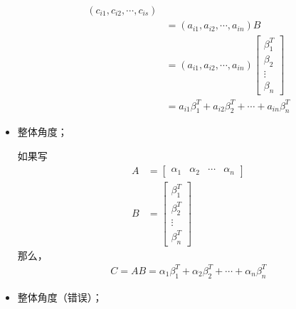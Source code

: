 \documentclass{article}
\begin{document}
\begin{itemize}
        \begin{align*}
          (c_{i1}, c_{i2}, \cdots, c_{is})                                           \\
           & = (a_{i1}, a_{i2}, \cdots, a_{in}) B                                    \\
           & = (a_{i1}, a_{i2}, \cdots, a_{in}) \begin{bmatrix}
                                                  \beta_{1}^T \\
                                                  \beta_{2}   \\
                                                  \vdots      \\
                                                  \beta_{n}
                                                \end{bmatrix}                       \\
           & = a_{i1} \beta_{1}^T + a_{i2} \beta_{2}^T + \cdots + a_{in} \beta_{n}^T
        \end{align*}

  \item 整体角度；

        如果写
        \begin{align*}
          A & = \begin{bmatrix}
                  \alpha_1 & \alpha_2 & \cdots & \alpha_n
                \end{bmatrix} \\
          B & = \begin{bmatrix}
                  \beta_{1}^T \\
                  \beta_{2}^T \\
                  \vdots      \\
                  \beta_{n}^T
                \end{bmatrix}
        \end{align*}
        那么，
        \begin{align*}
          C = A B = \alpha_1 \beta_{1}^T + \alpha_2 \beta_{2}^T + \cdots + \alpha_n \beta_{n}^T
        \end{align*}

  \item 整体角度（错误）；


\end{itemize}
\end{document}
